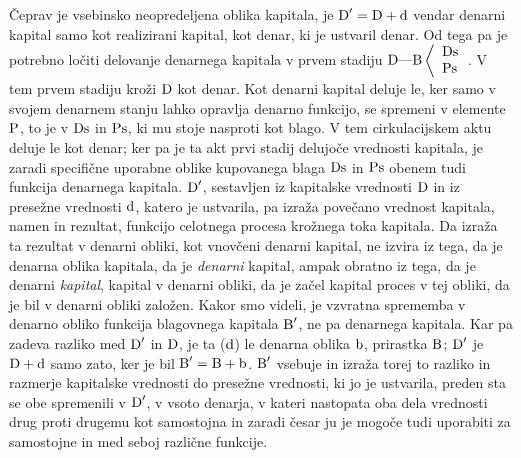 \documentclass[kapital_02.tex]{subfiles}
\begin{document}
Čeprav je vsebinsko neopredeljena oblika kapitala, je \( \textrm{D}' = \textrm{D} + \textrm{d} \) vendar denarni kapital samo kot realizirani kapital, kot denar, ki je ustvaril denar. Od tega pa je potrebno ločiti delovanje denarnega kapitala v prvem stadiju \( 
    \textrm{D}\textrm{---}\textrm{B}\left< 
    \begin{array}{l}
        \textrm{Ds}\\
        \textrm{Ps}\\
    \end{array}
    \right. 
\). V tem prvem stadiju kroži \( \textrm{D} \) kot denar. Kot denarni kapital deluje le, ker samo v svojem denarnem stanju lahko opravlja denarno funkcijo, se spremeni v elemente \( \textrm{P} \), to je v \( \textrm{Ds} \) in \( \textrm{Ps} \), ki mu stoje nasproti kot blago. V tem cirkulacijskem aktu deluje le kot denar; ker pa je ta akt prvi stadij delujoče vrednosti kapitala, je zaradi specifične uporabne oblike kupovanega blaga \( \textrm{Ds} \) in \( \textrm{Ps} \) obenem tudi funkcija denarnega kapitala. \( \textrm{D}' \), sestavljen iz kapitalske vrednosti \( \textrm{D} \) in iz presežne vrednosti \( \textrm{d} \), katero je ustvarila, pa izraža povečano vrednost kapitala, namen in rezultat, funkcijo celotnega procesa krožnega toka kapitala. Da izraža ta rezultat v denarni obliki, kot vnovčeni denarni kapital, ne izvira iz tega, da je denarna oblika kapitala, da je \emph{denarni} kapital, ampak obratno iz tega, da je denarni \emph{kapital}, kapital v denarni obliki, da je začel kapital proces v tej obliki, da je bil v denarni obliki založen. Kakor smo videli, je vzvratna sprememba v denarno obliko funkcija blagovnega kapitala \( \textrm{B}' \), ne pa denarnega kapitala. Kar pa zadeva razliko med \( \textrm{D}' \) in \( \textrm{D} \), je ta (\( \textrm{d} \)) le denarna oblika \( \textrm{b} \), prirastka \( \textrm{B} \); \( \textrm{D}' \) je \( \textrm{D} + \textrm{d} \) samo zato, ker je bil \( \textrm{B}' = \textrm{B} + \textrm{b} \). \( \textrm{B}' \) vsebuje in izraža torej to razliko in razmerje kapitalske vrednosti do presežne vrednosti, ki jo je ustvarila, preden sta se obe spremenili v \( \textrm{D}' \), v vsoto denarja, v kateri nastopata oba dela vrednosti drug proti drugemu kot samostojna in zaradi česar ju je mogoče tudi uporabiti za samostojne in med seboj različne funkcije.
\end{document}
